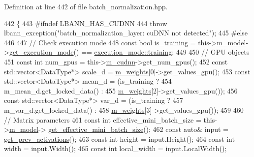Definition at line 442 of file batch\+\_\+normalization.\+hpp.


\begin{DoxyCode}
442                         \{
443 \textcolor{preprocessor}{  #ifndef LBANN\_HAS\_CUDNN}
444     \textcolor{keywordflow}{throw} lbann\_exception(\textcolor{stringliteral}{"batch\_normalization\_layer: cuDNN not detected"});
445 \textcolor{preprocessor}{  #else}
446 
447     \textcolor{comment}{// Check execution mode}
448     \textcolor{keyword}{const} \textcolor{keywordtype}{bool} is\_training = this->\hyperlink{classlbann_1_1Layer_a3d9315e99574166f2f33e37b572021d2}{m\_model}->\hyperlink{classlbann_1_1model_addb40597cf29aa6d31b6a7d09ef48608}{get\_execution\_mode}() == 
      \hyperlink{base_8hpp_a2781a159088df64ed7d47cc91c4dc0a8ac185ddac8b5a8f5aa23c5b80bc12d214}{execution\_mode::training};
449 
450     \textcolor{comment}{// GPU objects}
451     \textcolor{keyword}{const} \textcolor{keywordtype}{int} num\_gpus = this->\hyperlink{classlbann_1_1Layer_a08dbb94239e3b8c96329786c57c72e21}{m\_cudnn}->get\_num\_gpus();
452     \textcolor{keyword}{const} std::vector<DataType*> scale\_d = \hyperlink{classlbann_1_1Layer_a7954e30fbf9100a6ba4b56d02767a469}{m\_weights}[0]->get\_values\_gpu();
453     \textcolor{keyword}{const} std::vector<DataType*> mean\_d = (is\_training ?
454                                            m\_mean\_d.get\_locked\_data() :
455                                            \hyperlink{classlbann_1_1Layer_a7954e30fbf9100a6ba4b56d02767a469}{m\_weights}[2]->get\_values\_gpu());
456     \textcolor{keyword}{const} std::vector<DataType*> var\_d = (is\_training ?
457                                           m\_var\_d.get\_locked\_data() :
458                                           \hyperlink{classlbann_1_1Layer_a7954e30fbf9100a6ba4b56d02767a469}{m\_weights}[3]->get\_values\_gpu());
459 
460     \textcolor{comment}{// Matrix parameters}
461     \textcolor{keyword}{const} \textcolor{keywordtype}{int} effective\_mini\_batch\_size = this->\hyperlink{classlbann_1_1Layer_a3d9315e99574166f2f33e37b572021d2}{m\_model}->
      \hyperlink{classlbann_1_1model_a2a9b4cfa1c8c91e4131908751f9c4a6a}{get\_effective\_mini\_batch\_size}();
462     \textcolor{keyword}{const} \textcolor{keyword}{auto}& input = \hyperlink{classlbann_1_1Layer_a45853df73a2e72bfaa774665a0f37ed7}{get\_prev\_activations}();
463     \textcolor{keyword}{const} \textcolor{keywordtype}{int} height = input.Height();
464     \textcolor{keyword}{const} \textcolor{keywordtype}{int} width = input.Width();
465     \textcolor{keyword}{const} \textcolor{keywordtype}{int} local\_width = input.LocalWidth();

\end{DoxyCode}
